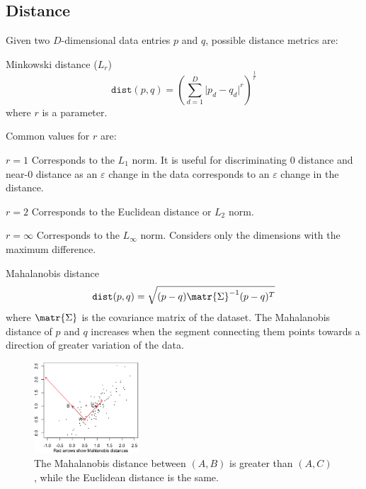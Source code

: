 \subsection{Distance}

Given two $D$-dimensional data entries $p$ and $q$, possible distance metrics are:
\begin{descriptionlist}
    \item[Minkowski distance ($L_r$)] 
        \[ \texttt{dist}(p, q) = \left( \sum_{d=1}^{D} \vert p_d - q_d \vert^r \right)^{\frac{1}{r}} \]
        where $r$ is a parameter.

        Common values for $r$ are:
        \begin{descriptionlist}
            \item[$r = 1$] 
                Corresponds to the $L_1$ norm.
                It is useful for discriminating 0 distance and near-0 distance as 
                an $\varepsilon$ change in the data corresponds to an $\varepsilon$ change in the distance.
            \item[$r = 2$]
                Corresponds to the Euclidean distance or $L_2$ norm.
            \item[$r = \infty$]
                Corresponds to the $L_\infty$ norm.
                Considers only the dimensions with the maximum difference.
        \end{descriptionlist}
    
    \item[Mahalanobis distance] 
        \[ \texttt{dist}(p, q) = \sqrt{ (p-q) \matr{\Sigma}^{-1} (p-q)^T } \]
        where $\matr{\Sigma}$ is the covariance matrix of the dataset.
        The Mahalanobis distance of $p$ and $q$ increases when the segment connecting them 
        points towards a direction of greater variation of the data.

        \begin{figure}[H]
            \centering
            \includegraphics[width=0.35\textwidth]{img/mahalanobis.png}
            \caption{The Mahalanobis distance between $(A, B)$ is greater than $(A, C)$, while the Euclidean distance is the same.}
        \end{figure}
\end{descriptionlist}

